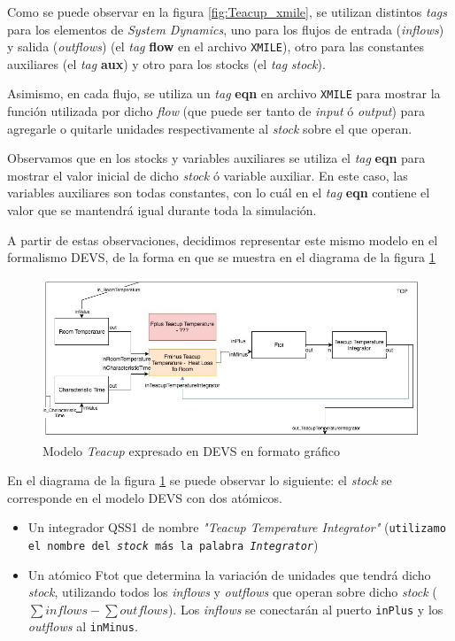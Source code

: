 Como se puede observar en la figura \ref{fig:Teacup_xmile}, se utilizan distintos \textit{tags} para los elementos de \textit{System Dynamics}, uno para los flujos de entrada (\textit{inflows}) y salida (\textit{outflows}) (el \textit{tag} \textbf{flow} en el archivo \texttt{XMILE}), otro para las constantes auxiliares (el  \textit{tag} \textbf{aux}) y otro para los stocks (el \textit{tag} \textit{stock}). 

Asimismo, en cada flujo, se utiliza un \textit{tag} \textbf{eqn} en archivo \texttt{XMILE} para mostrar la función utilizada por dicho \textit{flow} (que puede ser tanto de \textit{input} ó \textit{output}) para agregarle o quitarle unidades respectivamente al \textit{stock} sobre el que operan. 

Observamos que en los stocks y variables auxiliares se utiliza el \textit{tag} \textbf{eqn} para mostrar el valor inicial de dicho \textit{stock} ó variable auxiliar. En este caso, las variables auxiliares son todas constantes, con lo cuál en el \textit{tag} \textbf{eqn} contiene el valor que se mantendrá igual durante toda la simulación.

A partir de estas observaciones, decidimos representar este mismo modelo en el formalismo DEVS, de la forma en que se muestra en el diagrama de la figura \ref{fig:Teacup_devs_flattened}

\begin{figure}[!h]
\centering
\includegraphics[scale=0.5]{imagenes/Teacup_devs_flattened}
\caption{Modelo \textit{Teacup} expresado en DEVS en formato gráfico}
\label{fig:Teacup_devs_flattened}
\end{figure}

En el diagrama de la figura \ref{fig:Teacup_devs_flattened} se puede observar lo siguiente: el \textit{stock} se corresponde en el modelo DEVS con dos atómicos.

\begin{itemize}
	\item Un integrador QSS1 de nombre \textit{"Teacup Temperature Integrator"} (\texttt{utilizamo el nombre del \textit{stock} más la palabra \textit{Integrator}})
	\item Un atómico Ftot que determina la variación de unidades que tendrá dicho \textit{stock}, utilizando todos los \textit{inflows} y \textit{outflows} que operan sobre dicho \textit{stock} ($\sum inflows - \sum outflows $). Los \textit{inflows} se conectarán al puerto \texttt{inPlus} y los \textit{outflows} al \texttt{inMinus}. 
\end{itemize}

